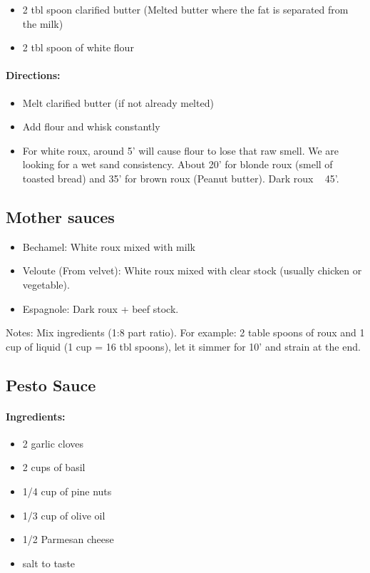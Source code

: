 \documentclass{article}
\begin{document}
\begin{itemize}
	\item 2 tbl spoon clarified butter (Melted butter where the fat is separated from the milk)
	\item 2 tbl spoon of white flour
\end{itemize}

\paragraph{Directions:}
\begin{itemize}
	\item Melt clarified butter (if not already melted)
	\item Add flour and whisk constantly
	\item For white roux, around 5' will cause flour to lose that raw smell. We are looking for a wet sand consistency. About 20' for blonde roux (smell of toasted bread) and 35' for brown roux (Peanut butter). Dark roux ~ 45'.
\end{itemize}

\subsection{Mother sauces}
\begin{itemize}
	\item Bechamel: White roux mixed with milk
	\item Veloute (From velvet): White roux mixed with clear stock (usually chicken or vegetable).
	\item Espagnole: Dark roux + beef stock.
\end{itemize}

Notes: Mix ingredients (1:8 part ratio). For example: 2 table spoons of roux and 1 cup of liquid (1 cup = 16 tbl spoons), let it simmer for 10' and strain at the end.

\subsection{Pesto Sauce}

\paragraph{Ingredients:}

\begin{itemize}
	\item 2 garlic cloves
	\item 2 cups of basil
	\item 1/4 cup of pine nuts
	\item 1/3 cup of olive oil
	\item 1/2 Parmesan cheese
	\item salt to taste
\end{itemize}
\end{document}
